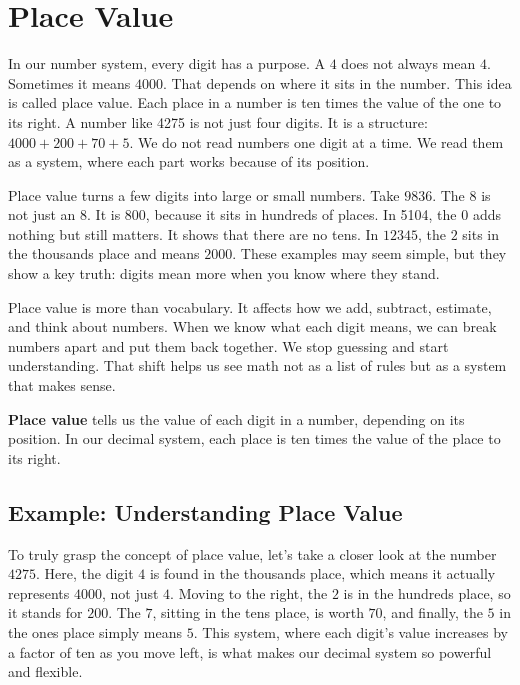 \cleardoublepage
\section{Place Value}
In our number system, every digit has a purpose. A $4$ does not always mean $4$. 
Sometimes it means $4000$. That depends on where it sits in the number. This 
idea is called place value. Each place in a number is ten times the value of 
the one to its right. A number like 4275 is not just four digits. It is a 
structure: $4000 + 200 + 70 + 5$. We do not read numbers one digit at a time. 
We read them as a system, where each part works because of its position.

Place value turns a few digits into large or small numbers. Take $9836$. 
The $8$ is not just an $8$. It is $800$, because it sits in hundreds of places. In 
5104, the 0 adds nothing but still matters. It shows that there are no tens. 
In $12345$, the $2$ sits in the thousands place and means $2000$. These examples may 
seem simple, but they show a key truth: digits mean more when you know 
where they stand.

Place value is more than vocabulary. It affects how we add, subtract, estimate, 
and think about numbers. When we know what each digit means, we can break 
numbers apart and put them back together. We stop guessing and start 
understanding. That shift helps us see math not as a list of rules but 
as a system that makes sense.

\textbf{Place value} tells us the value of each digit in a number, 
depending on its position. In our decimal system, each place is ten 
times the value of the place to its right.




\subsection*{Example: Understanding Place Value}

To truly grasp the concept of place value, let's take a closer look at the 
number $4275$. Here, the digit $4$ is found in the thousands place, which 
means it actually represents $4000$, not just $4$. Moving to the right, the 
$2$ is in the hundreds place, so it stands for $200$. The $7$, sitting in 
the tens place, is worth $70$, and finally, the $5$ in the ones place simply 
means $5$. This system, where each digit's value increases by a factor 
of ten as you move left, is what makes our decimal system so 
powerful and flexible.

